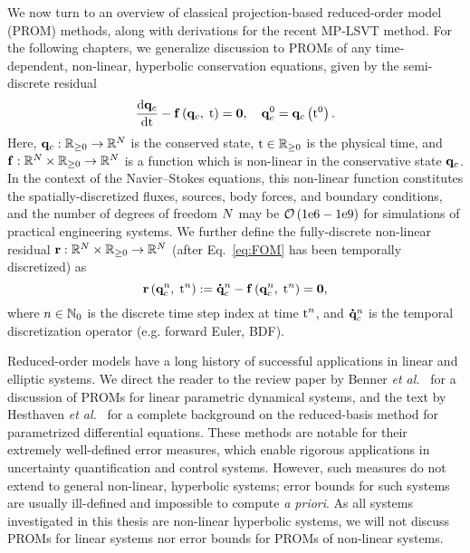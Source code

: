 We now turn to an overview of classical projection-based reduced-order model (PROM) methods, along with derivations for the recent MP-LSVT method. For the following chapters, we generalize discussion to PROMs of any time-dependent, non-linear, hyperbolic conservation equations, given by the semi-discrete residual
%
\begin{equation}\label{eq:FOM}
    \frac{\text{d} \mathbf{q}_{c}}{\text{d} \text{t}} - \mathbf{f} \left(\mathbf{q}_{c}, \; \text{t}\right) = \mathbf{0}, \quad \mathbf{q}_{c}^0 = \mathbf{q}_{c} \left(\text{t}^0\right).
\end{equation}
%
Here, $\mathbf{q}_{c}: \mathbb{R}_{\ge 0} \rightarrow \mathbb{R}^{N}$ is the conserved state, $\text{t} \in \mathbb{R}_{\ge 0}$ is the physical time, and $\mathbf{f}: \mathbb{R}^{N} \times \mathbb{R}_{\ge 0} \rightarrow \mathbb{R}^{N}$ is a function which is non-linear in the conservative state $\mathbf{q}_{c}$. In the context of the Navier--Stokes equations, this non-linear function constitutes the spatially-discretized fluxes, sources, body forces, and boundary conditions, and the number of degrees of freedom $N$ may be $\mathcal{O}\left(1\text{e}6-1\text{e}9\right)$ for simulations of practical engineering systems. We further define the fully-discrete non-linear residual $\mathbf{r}: \mathbb{R}^{N} \times \mathbb{R}_{\ge 0} \rightarrow \mathbb{R}^{N}$ (after Eq.~\ref{eq:FOM} has been temporally discretized) as
%
\begin{equation}
    \mathbf{r}\left(\mathbf{q}_{c}^{n}, \; \text{t}^{n}\right) := \accentset{\mbox{\large\bfseries .}}{\mathbf{q}}_{c}^{n} - \mathbf{f} \left(\mathbf{q}_{c}^{n}, \; \text{t}^{n}\right) = \mathbf{0},
\end{equation}
%
where $n \in \mathbb{N}_0$ is the discrete time step index at time $\text{t}^{n}$, and $\accentset{\mbox{\large\bfseries .}}{\mathbf{q}}_{c}^{n}$ is the temporal discretization operator (e.g. forward Euler, BDF).

Reduced-order models have a long history of successful applications in linear and elliptic systems. We direct the reader to the review paper by Benner \textit{et al.}~\cite{Benner2015} for a discussion of PROMs for linear parametric dynamical systems, and the text by Hesthaven \textit{et al.}~\cite{certRedBasisBook} for a complete background on the reduced-basis method for parametrized differential equations. These methods are notable for their extremely well-defined error measures, which enable rigorous applications in uncertainty quantification and control systems. However, such measures do not extend to general non-linear, hyperbolic systems; error bounds for such systems are usually ill-defined and impossible to compute \textit{a priori}. As all systems investigated in this thesis are non-linear hyperbolic systems, we will not discuss PROMs for linear systems nor error bounds for PROMs of non-linear systems.